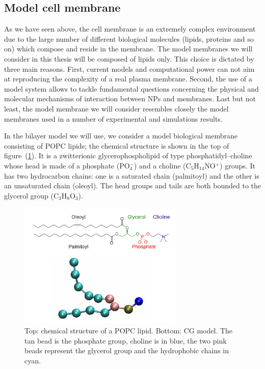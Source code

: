 \subsection{Model cell membrane}
As we have seen above, the cell membrane is an extremely complex environment due to the large number of different biological molecules (lipids, proteins and so on) which compose and reside in the membrane. The model membranes we will consider in this thesis will be composed of lipids only. This choice is dictated by three main reasons. First, current models and computational power can not aim at reproducing the complexity of a real plasma membrane. Second, the use of a model system allows to tackle fundamental questions concerning the physical and molecular mechanisms of interaction between \acp{NP} and membranes. Last but not least, the model membrane we will consider resembles closely the model membranes used in a number of experimental and simulations results.  

In the bilayer model we will use, we consider a model biological membrane consisting of \ac{POPC} lipids; the 
chemical structure is shown in the top of figure~(\ref{fig:popc}). It is a zwitterionic glycerophospholipid of 
type phosphatidyl--choline whose head is made of a phosphate (PO$_4^-$) and a choline (C$_5$H$_{14}$NO$^+$) 
groups. It has two hydrocarbon chains: one is a saturated chain (palmitoyl) and the other is an unsaturated chain 
(oleoyl). The head groups and tails are both bounded to the glycerol group (C$_3$H$_8$O$_3$).
\begin{figure}[!ht]
	\centering
	\includegraphics[width=0.7\textwidth]{./img/POPC/popc}
	\caption{Top: chemical structure of a \acs{POPC} lipid. Bottom: \martini \acs{CG} model. The tan bead is the phosphate group, choline is in blue, the two pink beads represent the glycerol group and the hydrophobic chains in cyan.}
	\label{fig:popc}
\end{figure}

